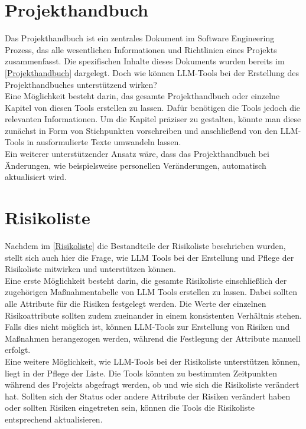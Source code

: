 \section{Projekthandbuch}  \label{LLMProjekthandbuch}

Das Projekthandbuch ist ein zentrales Dokument im Software Engineering Prozess, das alle wesentlichen Informationen und 
Richtlinien eines Projekts zusammenfasst. Die spezifischen Inhalte dieses Dokuments wurden bereits im 
\autoref{Projekthandbuch} dargelegt. Doch wie können LLM-Tools bei der Erstellung des 
Projekthandbuches unterstützend wirken?\\

Eine Möglichkeit besteht darin, das gesamte Projekthandbuch oder einzelne Kapitel von diesen Tools erstellen zu 
lassen. Dafür benötigen die Tools jedoch die relevanten Informationen. Um die Kapitel präziser zu gestalten, könnte 
man diese zunächst in Form von Stichpunkten vorschreiben und anschließend von den LLM-Tools in ausformulierte Texte 
umwandeln lassen.\\

Ein weiterer unterstützender Ansatz wäre, dass das Projekthandbuch bei Änderungen, wie beispielsweise personellen 
Veränderungen, automatisch aktualisiert wird.

\section{Risikoliste}  \label{LLMRisikoliste}

Nachdem im \autoref{Risikoliste} die Bestandteile der Risikoliste beschrieben wurden, stellt sich auch hier die Frage, 
wie LLM Tools bei der Erstellung und Pflege der Risikoliste mitwirken und unterstützen können.\\

Eine erste Möglichkeit besteht darin, die gesamte Risikoliste einschließlich der zugehörigen Maßnahmentabelle von 
LLM Tools erstellen zu lassen. Dabei sollten alle Attribute für die Risiken festgelegt werden. Die Werte der einzelnen 
Risikoattribute sollten zudem zueinander in einem konsistenten Verhältnis stehen.\\
Falls dies nicht möglich ist, können LLM-Tools zur Erstellung von Risiken und Maßnahmen herangezogen werden, während 
die Festlegung der Attribute manuell erfolgt.\\

Eine weitere Möglichkeit, wie LLM-Tools bei der Risikoliste unterstützen können, liegt in der Pflege der Liste. Die 
Tools könnten zu bestimmten Zeitpunkten während des Projekts abgefragt werden, ob und wie sich die Risikoliste 
verändert hat. Sollten sich der Status oder andere Attribute der Risiken verändert haben oder sollten Risiken 
eingetreten sein, können die Tools die Risikoliste entsprechend aktualisieren.

